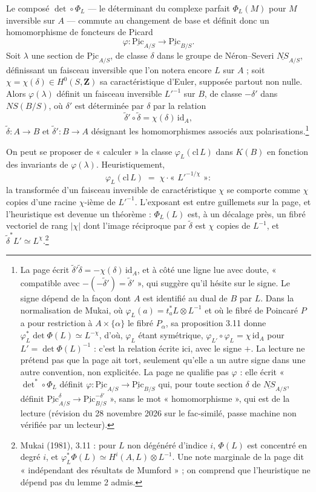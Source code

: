 \documentclass[11pt,a4paper]{article}
\begin{document}
Le composé $\det \circ \Phi_L$ — le déterminant du complexe parfait
$\Phi_L(M)$ pour $M$ inversible sur $A$ — commute au changement de base et
définit donc un homomorphisme de foncteurs de Picard
\[
  \varphi \colon \underline{\mathrm{Pic}}_{A/S} \longrightarrow \underline{\mathrm{Pic}}_{B/S}.
\]
Soit $\lambda$ une section de $\underline{\mathrm{Pic}}_{A/S}$, de classe
$\delta$ dans le groupe de Néron--Severi $\underline{NS}_{A/S}$, définissant
un faisceau inversible que l'on notera encore $L$ sur $A$ ; soit $\chi =
\chi(\delta) \in H^{0}(S, \mathbf{Z})$ sa caractéristique d'Euler, supposée
partout non nulle. Alors $\varphi(\lambda)$ définit un faisceau inversible
$L'^{-1}$ sur $B$, de classe $-\delta'$ dans $NS(B/S)$, où $\delta'$ est
déterminée par $\delta$ par la relation
\[
  \tilde\delta' \circ \tilde\delta = \chi(\delta)\,\mathrm{id}_A,
\]
$\tilde\delta \colon A \to B$ et $\tilde\delta' \colon B \to A$ désignant les
homomorphismes associés aux polarisations.\footnote{La page écrit
$\tilde\delta'\tilde\delta = -\chi(\delta)\,\mathrm{id}_A$, et à côté une
ligne lue avec doute, « compatible avec $-(-\tilde\delta') = \tilde\delta'$ »,
qui suggère qu'il hésite sur le signe. Le signe dépend de la façon dont $A$
est identifié au dual de $B$ par $L$. Dans la normalisation de Mukai, où
$\varphi_L(a) = t_a^{*}L \otimes L^{-1}$ et où le fibré de Poincaré $P$ a
pour restriction à $A \times \{\alpha\}$ le fibré $P_\alpha$, sa proposition
3.11 donne $\varphi_L^{*}\det\Phi(L) \simeq L^{-\chi}$, d'où, $\varphi_L$
étant symétrique, $\varphi_{L'} \circ \varphi_L = \chi\,\mathrm{id}_A$ pour
$L' = \det\Phi(L)^{-1}$ : c'est la relation écrite ici, avec le signe $+$. La
lecture ne prétend pas que la page ait tort, seulement qu'elle a un autre
signe dans une autre convention, non explicitée. La page ne qualifie pas
$\varphi$ : elle écrit « $\det^{*} \circ \Phi_L$ définit $\varphi \colon
\underline{\mathrm{Pic}}_{A/S} \to \underline{\mathrm{Pic}}_{B/S}$ qui, pour
toute section $\delta$ de $\underline{NS}_{A/S}$, définit
$\underline{\mathrm{Pic}}^{\delta}_{A/S} \to
\underline{\mathrm{Pic}}^{-\delta'}_{B/S}$ », sans le mot « homomorphisme »,
qui est de la lecture (révision du 28 novembre 2026 sur le fac-similé, passe
machine non vérifiée par un lecteur).}

On peut se proposer de « calculer » la classe $\varphi_L(\mathrm{cl}\,L)$ dans
$K(B)$ en fonction des invariants de $\varphi(\lambda)$. Heuristiquement,
\[
  \varphi_L(\mathrm{cl}\,L) \;=\; \chi \cdot \text{« } L'^{-1/\chi} \text{ »} :
\]
la transformée d'un faisceau inversible de caractéristique $\chi$ se comporte
comme $\chi$ copies d'une racine $\chi$-ième de $L'^{-1}$. L'exposant est
entre guillemets sur la page, et l'heuristique est devenue un théorème :
$\Phi_L(L)$ est, à un décalage près, un fibré vectoriel de rang $|\chi|$ dont
l'image réciproque par $\tilde\delta$ est $\chi$ copies de $L^{-1}$, et
$\tilde\delta^{*}L' \simeq L^{\chi}$.\footnote{Mukai (1981), 3.11 : pour $L$
non dégénéré d'indice $i$, $\Phi(L)$ est concentré en degré $i$, et
$\varphi_L^{*}\Phi(L) \simeq H^{i}(A, L) \otimes L^{-1}$. Une note marginale
de la page dit « indépendant des résultats de Mumford » ; on comprend que
l'heuristique ne dépend pas du lemme 2 admis.}
\end{document}
